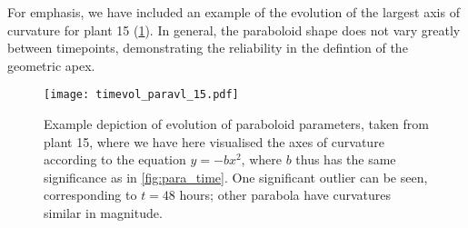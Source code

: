 For emphasis, we have included an example of the evolution of the largest axis
of curvature for plant 15 (\cref{fig:timeevol_ex}). In general, the paraboloid
shape does not vary greatly between timepoints, demonstrating the reliability in
the defintion of the geometric apex.

\begin{figure}[H]
  \centering
  \texttt{[image: timevol\_paravl\_15.pdf]}
  \caption[Example of paraboloid shape evolution]{Example depiction of evolution
    of paraboloid parameters, taken from plant 15, where
    we have here visualised the axes of curvature according to the equation
    $y = -bx^2$, where $b$ thus has the same significance as in
    \cref{fig:para_time}. One significant outlier can be seen, corresponding to
    $t = 48$ hours; other parabola have curvatures similar in magnitude.}
  \label{fig:timeevol_ex}
\end{figure}
